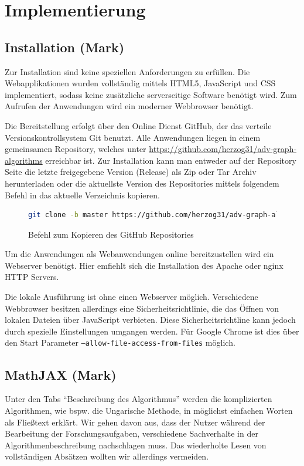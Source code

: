 \chapter{Implementierung}

\section{Installation (Mark)}
Zur Installation sind keine speziellen Anforderungen zu erfüllen. Die Webapplikationen wurden vollständig mittels HTML5, JavaScript und CSS implementiert, sodass keine zusätzliche serverseitige Software benötigt wird. Zum Aufrufen der Anwendungen wird ein moderner Webbrowser benötigt.

Die Bereitstellung erfolgt über den Online Dienst GitHub, der das verteile Versionskontrollsystem Git benutzt. 
Alle Anwendungen liegen in einem gemeinsamen Repository, welches unter \url{https://github.com/herzog31/adv-graph-algorithms} erreichbar ist. Zur Installation kann man entweder auf der Repository Seite die letzte freigegebene Version (Release) als Zip oder Tar Archiv herunterladen oder die aktuellste Version des Repositories mittels folgendem Befehl in das aktuelle Verzeichnis kopieren.

\begin{figure}[h!]
\begin{lstlisting}[language=Bash]
git clone -b master https://github.com/herzog31/adv-graph-algorithms.git
\end{lstlisting}
\caption[Repository Kopieren]{Befehl zum Kopieren des GitHub Repositories}\label{fig:listing-github}
\end{figure}

Um die Anwendungen als Webanwendungen online bereitzustellen wird ein Webserver benötigt. Hier emfiehlt sich die Installation des Apache oder nginx  HTTP Servers.

Die lokale Ausführung ist ohne einen Webserver möglich. Verschiedene Webbrowser besitzen allerdings eine Sicherheitsrichtlinie, die das Öffnen von lokalen Dateien über JavaScript verbieten. Diese Sicherheitsrichtline kann jedoch durch spezielle Einstellungen umgangen werden. Für Google Chrome ist dies über den Start Parameter \texttt{--allow-file-access-from-files} möglich.

\section{MathJAX (Mark)}
Unter den Tabs \enquote{Beschreibung des Algorithmus} werden die komplizierten Algorithmen, wie bspw. die Ungarische Methode, in möglichst einfachen Worten als Fließtext erklärt. Wir gehen davon aus, dass der Nutzer während der Bearbeitung der Forschungsaufgaben, verschiedene Sachverhalte in der Algorithmenbeschreibung nachschlagen muss. Das wiederholte Lesen von vollständigen Absätzen wollten wir allerdings vermeiden.

